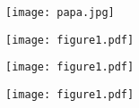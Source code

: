 \documentclass[10pt,a4paper]{article}
\author{carla}
\begin{document}
\begin{center}
\texttt{[image: papa.jpg]}
\end{center}

\begin{center}
\texttt{[image: figure1.pdf]}
\end{center}

\begin{center}
\texttt{[image: figure1.pdf]}
\end{center}

\begin{center}
\texttt{[image: figure1.pdf]}
\end{center}
\end{document}
